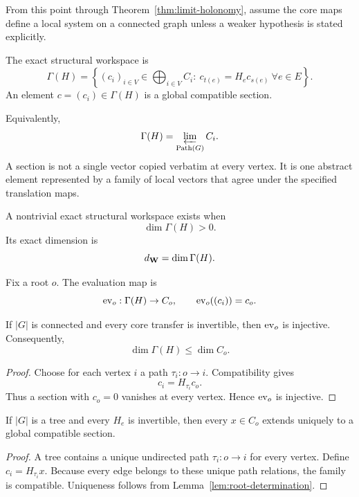 

From this point through Theorem~\ref{thm:limit-holonomy}, assume the core maps
define a local system on a connected graph unless a weaker hypothesis is
stated explicitly.

\begin{definition}\label{def:global-section}
The exact structural workspace is
\[
\boxed{
\Gamma(H)
=
\left\{
(c_i)_{i\in V}\in\bigoplus_{i\in V}C_i:
\ c_{t(e)}=H_ec_{s(e)}\ \forall e\in E
\right\}.
}
\]
An element \(c=(c_i)\in\Gamma(H)\) is a global compatible section.
\end{definition}

Equivalently,
\[
\Gamma(H)=\varprojlim_{\operatorname{Path}(G)}C_i.
\]
A section is not a single vector copied verbatim at every vertex. It is one
abstract element represented by a family of local vectors that agree under the
specified translation maps.

A nontrivial exact structural workspace exists when
\[
\dim\Gamma(H)>0.
\]
Its exact dimension is
\[
d_{\mathbf W}=\dim\Gamma(H).
\]

Fix a root \(o\). The evaluation map is
\[
\operatorname{ev}_o:\Gamma(H)\to C_o,
\qquad
\operatorname{ev}_o((c_i))=c_o.
\]

\begin{lemma}\label{lem:root-determination}
If \(|G|\) is connected and every core transfer is invertible, then
\(\operatorname{ev}_o\) is injective. Consequently,
\[
\dim\Gamma(H)\leq\dim C_o.
\]
\end{lemma}

\begin{proof}
Choose for each vertex \(i\) a path \(\tau_i:o\to i\). Compatibility gives
\[
c_i=H_{\tau_i}c_o.
\]
Thus a section with \(c_o=0\) vanishes at every vertex. Hence \(\operatorname{ev}_o\) is
injective.
\end{proof}

\begin{lemma}\label{lem:tree-propagation}
If \(|G|\) is a tree and every \(H_e\) is invertible, then every
\(x\in C_o\) extends uniquely to a global compatible section.
\end{lemma}

\begin{proof}
A tree contains a unique undirected path \(\tau_i:o\to i\) for every vertex.
Define \(c_i=H_{\tau_i}x\). Because every edge belongs to these unique path
relations, the family is compatible. Uniqueness follows from
Lemma~\ref{lem:root-determination}.
\end{proof}

